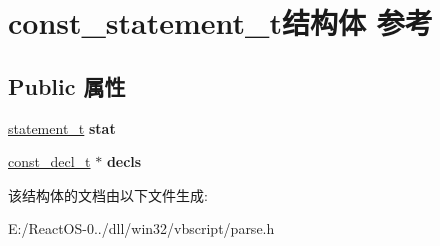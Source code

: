 \hypertarget{structconst__statement__t}{}\section{const\+\_\+statement\+\_\+t结构体 参考}
\label{structconst__statement__t}
\subsection*{Public 属性}
\begin{DoxyCompactItemize}
\item 
\mbox{\label{structconst__statement__t_a3212fa1a9b7313616a2ccaa21c7f16d3}} 
\hyperlink{struct__statement__t}{statement\+\_\+t} {\bfseries stat}
\item 
\mbox{\label{structconst__statement__t_a257bddae3da5d248379f3c8927e56d6f}} 
\hyperlink{struct__const__decl__t}{const\+\_\+decl\+\_\+t} $\ast$ {\bfseries decls}
\end{DoxyCompactItemize}


该结构体的文档由以下文件生成\+:\begin{DoxyCompactItemize}
\item 
E\+:/\+React\+O\+S-\/0../dll/win32/vbscript/parse.\+h\end{DoxyCompactItemize}
